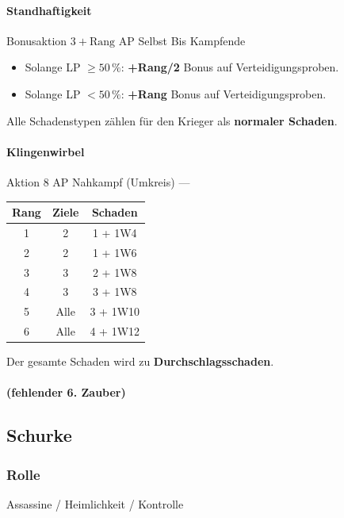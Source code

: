 \paragraph*{Standhaftigkeit}
\skillcard
{}
{Bonusaktion}
{$3 + \text{Rang}$ AP}
{Selbst}
{Bis Kampfende}
{
	\begin{itemize}
		\item Solange LP $\ge 50\,\%$: \textbf{+Rang/2} Bonus auf Verteidigungsproben.
		\item Solange LP $< 50\,\%$: \textbf{+Rang} Bonus auf Verteidigungsproben.
	\end{itemize}
}
{
	Alle Schadenstypen zählen für den Krieger als \textbf{normaler Schaden}.
}

\paragraph*{Klingenwirbel}
\skillcard
{}
{Aktion}
{8 AP}
{Nahkampf (Umkreis)}
{—}
{
	\begin{center}
		\begin{tabular}{ccc}
			\toprule
			\textbf{Rang} & \textbf{Ziele} & \textbf{Schaden} \\
			\midrule
			1 & 2 & 1 + 1W4 \\
			2 & 2 & 1 + 1W6 \\
			3 & 3 & 2 + 1W8 \\
			4 & 3 & 3 + 1W8 \\
			5 & Alle & 3 + 1W10 \\
			6 & Alle & 4 + 1W12 \\
			\bottomrule
		\end{tabular}
	\end{center}
}
{
	Der gesamte Schaden wird zu \textbf{Durchschlagsschaden}.
}

\paragraph*{(fehlender 6. Zauber)}

\subsection{Schurke}

\subsubsection*{Rolle}
Assassine / Heimlichkeit / Kontrolle

